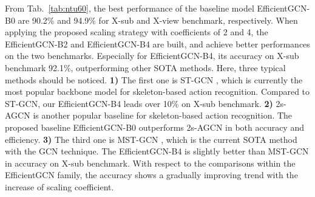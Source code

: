 \documentclass[10pt,journal,compsoc]{IEEEtran}
\begin{document}
From Tab.~\ref{tab:ntu60}, the best performance of the baseline model EfficientGCN-B0 are 90.2\% and 94.9\% for X-sub and X-view benchmark, respectively. When applying the proposed scaling strategy with coefficients of 2 and 4, the EfficientGCN-B2 and EfficientGCN-B4 are built, and achieve better performances on the two benchmarks. Especially for EfficientGCN-B4, its accuracy on X-sub benchmark 92.1\%, outperforming other SOTA methods. Here, three typical methods should be noticed. {\bf 1)} The first one is ST-GCN \cite{yan2018spatial}, which is currently the most popular backbone model for skeleton-based action recognition. Compared to ST-GCN, our EfficientGCN-B4 leads over 10\% on X-sub benchmark. {\bf 2)} 2s-AGCN \cite{shi2019two} is another popular baseline for skeleton-based action recognition. The proposed baseline EfficientGCN-B0 outperforms 2s-AGCN in both accuracy and efficiency. {\bf 3)} The third one is MST-GCN \cite{chen2021multi}, which is the current SOTA method with the GCN technique. The EfficientGCN-B4 is slightly better than MST-GCN in accuracy on X-sub benchmark. With respect to the comparisons within the EfficientGCN family, the accuracy shows a gradually improving trend with the increase of scaling coefficient.
\end{document}
